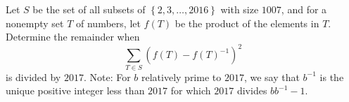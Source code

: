Let $S$ be the set of all subsets of $\left\{2,3,\ldots,2016\right\}$ with size $1007$, and for a nonempty set $T$ of numbers, let $f(T)$ be the product of the elements in $T$. Determine the remainder when \[ \sum_{T\in S}\left(f(T)-f(T)^{-1}\right)^2\] is divided by $2017$. Note: For $b$ relatively prime to $2017$, we say that $b^{-1}$ is the unique positive integer less than $2017$ for which $2017$ divides $bb^{-1} -1$.

